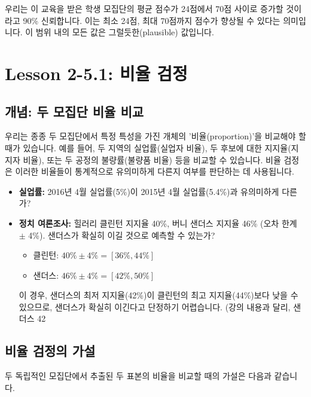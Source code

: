 \documentclass[11pt,a4paper]{book}
\theoremstyle{definition}
\begin{document}
\begin{summarybox}[title=90\% 신뢰 구간 해석]
우리는 이 교육을 받은 학생 모집단의 평균 점수가 24점에서 70점 사이로 증가할 것이라고 90\% 신뢰합니다. 이는 최소 24점, 최대 70점까지 점수가 향상될 수 있다는 의미입니다. 이 범위 내의 모든 값은 그럴듯한(plausible) 값입니다.
\end{summarybox}


\section{Lesson 2-5.1: 비율 검정}

\subsection{개념: 두 모집단 비율 비교}
우리는 종종 두 모집단에서 특정 특성을 가진 개체의 '비율(proportion)'을 비교해야 할 때가 있습니다. 예를 들어, 두 지역의 실업률(실업자 비율), 두 후보에 대한 지지율(지지자 비율), 또는 두 공정의 불량률(불량품 비율) 등을 비교할 수 있습니다. 비율 검정은 이러한 비율들이 통계적으로 유의미하게 다른지 여부를 판단하는 데 사용됩니다.

\begin{examplebox}[title=비율 비교의 실제 사례]
\begin{itemize}
    \item \textbf{실업률:} 2016년 4월 실업률(5\%)이 2015년 4월 실업률(5.4\%)과 유의미하게 다른가?
    \item \textbf{정치 여론조사:} 힐러리 클린턴 지지율 40\%, 버니 샌더스 지지율 46\% (오차 한계 $\pm$ 4\%). 샌더스가 확실히 이길 것으로 예측할 수 있는가?
    \begin{itemize}
        \item 클린턴: $40\% \pm 4\% = [36\%, 44\%]$
        \item 샌더스: $46\% \pm 4\% = [42\%, 50\%]$
    \end{itemize}
    이 경우, 샌더스의 최저 지지율(42\%)이 클린턴의 최고 지지율(44\%)보다 낮을 수 있으므로, 샌더스가 확실히 이긴다고 단정하기 어렵습니다. (강의 내용과 달리, 샌더스 42%
\end{itemize}
\end{examplebox}

\subsection{비율 검정의 가설}
두 독립적인 모집단에서 추출된 두 표본의 비율을 비교할 때의 가설은 다음과 같습니다.
\end{document}
